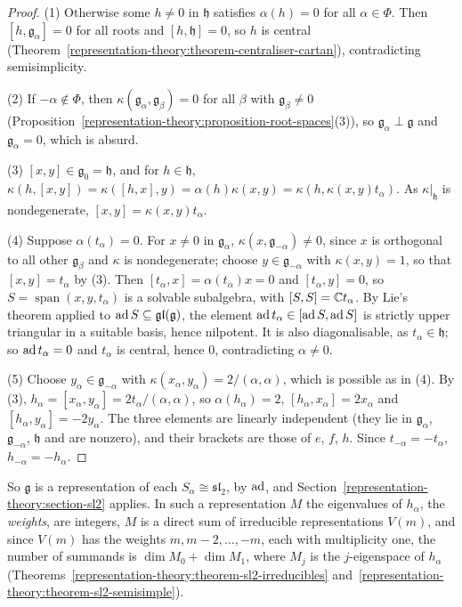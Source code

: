 \begin{proof}
(1) Otherwise some $h \neq 0$ in $\mathfrak{h}$ satisfies $\alpha(h) = 0$ for all $\alpha \in \Phi$. Then $[h, \mathfrak{g}_\alpha] = 0$ for all roots and $[h, \mathfrak{h}] = 0$, so $h$
is central (Theorem~\ref{representation-theory:theorem-centraliser-cartan}), contradicting semisimplicity.

(2) If $-\alpha \notin \Phi$, then $\kappa(\mathfrak{g}_\alpha, \mathfrak{g}_\beta) = 0$ for all $\beta$ with $\mathfrak{g}_\beta \neq 0$
(Proposition~\ref{representation-theory:proposition-root-spaces}(3)), so $\mathfrak{g}_\alpha \perp \mathfrak{g}$ and $\mathfrak{g}_\alpha = 0$, which is absurd.

(3) $[x, y] \in \mathfrak{g}_0 = \mathfrak{h}$, and for $h \in \mathfrak{h}$, $\kappa(h, [x, y]) = \kappa([h, x], y) = \alpha(h)\kappa(x, y) = \kappa(h, \kappa(x, y)t_\alpha)$. As
$\kappa|_{\mathfrak{h}}$ is nondegenerate, $[x, y] = \kappa(x, y)t_\alpha$.

(4) Suppose $\alpha(t_\alpha) = 0$. For $x \neq 0$ in $\mathfrak{g}_\alpha$, $\kappa(x, \mathfrak{g}_{-\alpha}) \neq 0$, since $x$ is orthogonal to all other $\mathfrak{g}_\beta$ and
$\kappa$ is nondegenerate; choose $y \in \mathfrak{g}_{-\alpha}$ with $\kappa(x, y) = 1$, so that $[x, y] = t_\alpha$ by (3). Then $[t_\alpha, x] = \alpha(t_\alpha)x = 0$ and
$[t_\alpha, y] = 0$, so $S = \operatorname{span}(x, y, t_\alpha)$ is a solvable subalgebra, with $[S, S] = \mathbb{C} t_\alpha$. By Lie's theorem applied to $\operatorname{ad} S \subseteq \mathfrak{gl}(\mathfrak{g})$,
the element $\operatorname{ad} t_\alpha \in [\operatorname{ad} S, \operatorname{ad} S]$ is strictly upper triangular in a suitable basis, hence nilpotent. It is also diagonalisable, as $t_\alpha \in \mathfrak{h}$; so
$\operatorname{ad} t_\alpha = 0$ and $t_\alpha$ is central, hence $0$, contradicting $\alpha \neq 0$.

(5) Choose $y_\alpha \in \mathfrak{g}_{-\alpha}$ with $\kappa(x_\alpha, y_\alpha) = 2/(\alpha, \alpha)$, which is possible as in (4). By (3), $h_\alpha = [x_\alpha, y_\alpha] =
2t_\alpha/(\alpha, \alpha)$, so $\alpha(h_\alpha) = 2$, $[h_\alpha, x_\alpha] = 2x_\alpha$ and $[h_\alpha, y_\alpha] = -2y_\alpha$. The three elements are linearly independent (they lie in
$\mathfrak{g}_\alpha$, $\mathfrak{g}_{-\alpha}$, $\mathfrak{h}$ and are nonzero), and their brackets are those of $e$, $f$, $h$. Since $t_{-\alpha} = -t_\alpha$, $h_{-\alpha} = -h_\alpha$.
\end{proof}

So $\mathfrak{g}$ is a representation of each $S_\alpha \cong \mathfrak{sl}_2$, by $\operatorname{ad}$, and Section~\ref{representation-theory:section-sl2} applies. In such a representation $M$ the
eigenvalues of $h_\alpha$, the \emph{weights}, are integers, $M$ is a direct sum of irreducible representations $V(m)$, and since $V(m)$ has the weights
$m, m - 2, \ldots, -m$, each with multiplicity one, the number of summands is $\dim M_0 + \dim M_1$, where $M_j$ is the $j$-eigenspace of $h_\alpha$
(Theorems~\ref{representation-theory:theorem-sl2-irreducibles} and~\ref{representation-theory:theorem-sl2-semisimple}).

